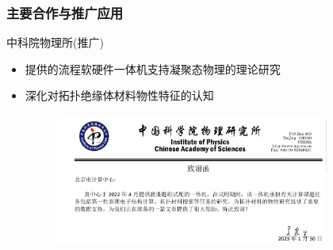 \begin{frame}
	\frametitle{主要合作与推广应用}
中科院物理所(推广)
	\begin{itemize}
	 \setlength{\itemsep}{10pt}
		\item 提供的流程软硬件一体机支持凝聚态物理的理论研究
		\item 深化对拓扑绝缘体材料物性特征的认知%
\begin{figure}[h!]
\centering
\vskip 5pt
\includegraphics[height=1.7in]{Figures/Acknowledge-IP_CAS-BCC.png}
\label{Acknowleges-IP_CAS}
\end{figure}
	\end{itemize}
\end{frame}

